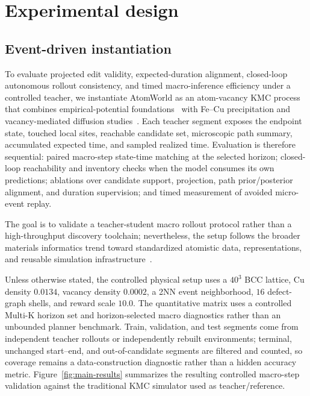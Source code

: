 \documentclass{article}
\begin{document}
\section{Experimental design}

\subsection{Event-driven instantiation}

To evaluate projected edit validity, expected-duration alignment, closed-loop autonomous rollout consistency, and timed macro-inference efficiency under a controlled teacher, we instantiate AtomWorld as an atom-vacancy KMC process that combines empirical-potential foundations~\cite{daw1984eam,finnis1984nbody} with Fe--Cu precipitation and vacancy-mediated diffusion studies~\cite{soisson1996cufe,soisson2007cufe,messina2017annkmc,castin2017nnp}. Each teacher segment exposes the endpoint state, touched local sites, reachable candidate set, microscopic path summary, accumulated expected time, and sampled realized time. Evaluation is therefore sequential: paired macro-step state-time matching at the selected horizon; closed-loop reachability and inventory checks when the model consumes its own predictions; ablations over candidate support, projection, path prior/posterior alignment, and duration supervision; and timed measurement of avoided micro-event replay.

The goal is to validate a teacher-student macro rollout protocol rather than a high-throughput discovery toolchain; nevertheless, the setup follows the broader materials informatics trend toward standardized atomistic data, representations, and reusable simulation infrastructure~\cite{jain2013materialsproject,curtarolo2012aflow,ong2013pymatgen,ward2018matminer,choudhary2020jarvis}.

Unless otherwise stated, the controlled physical setup uses a $40^3$ BCC lattice, Cu density $0.0134$, vacancy density $0.0002$, a 2NN event neighborhood, $16$ defect-graph shells, and reward scale $10.0$. The quantitative matrix uses a controlled Multi-K horizon set and horizon-selected macro diagnostics rather than an unbounded planner benchmark. Train, validation, and test segments come from independent teacher rollouts or independently rebuilt environments; terminal, unchanged start--end, and out-of-candidate segments are filtered and counted, so coverage remains a data-construction diagnostic rather than a hidden accuracy metric. Figure~\ref{fig:main-results} summarizes the resulting controlled macro-step validation against the traditional KMC simulator used as teacher/reference.
\end{document}

